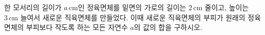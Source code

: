 한 모서리의 길이가 $a\,\mathrm{cm}$인 정육면체를 밑면의 가로의 길이는 $2\,\mathrm{cm}$ 줄이고, 높이는 $3\,\mathrm{cm}$ 늘여서 새로운 직육면체를 만들었다. 이때 새로운 직육면체의 부피가 원래의 정육면체의 부피보다 작도록 하는 모든 자연수 $a$의 값의 합을 구하시오.
